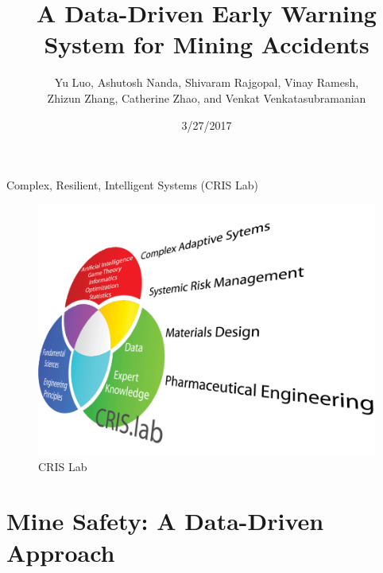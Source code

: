 \documentclass[
]{beamer}
\title[Mining Accident Data Analysis]{A Data-Driven Early Warning System for Mining Accidents}
\author[Luo et al.]{Yu Luo, Ashutosh Nanda, Shivaram Rajgopal, Vinay Ramesh,\\
Zhizun Zhang, Catherine Zhao, and Venkat Venkatasubramanian}
\institute[Columbia University]{Chemical Engineering, Computer Science, and Business School\\
Columbia University}
\date{3/27/2017}
\begin{document}
\frame{\titlepage}

\begin{frame}
\tableofcontents[hideallsubsections]
\end{frame}

\begin{frame}{Complex, Resilient, Intelligent Systems (CRIS Lab)}

\begin{figure}[htbp]
\centering
\includegraphics{CrisResearch720.png}
\caption{CRIS Lab}
\end{figure}

\end{frame}

\section{Mine Safety: A Data-Driven
Approach}\label{mine-safety-a-data-driven-approach}
\end{document}

